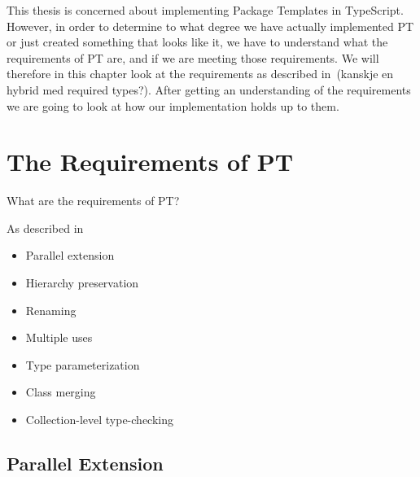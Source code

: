 
This thesis is concerned about implementing Package Templates in TypeScript.
However, in order to determine to what degree we have actually implemented PT or just created something that looks like it, we have to understand what the requirements of PT are, and if we are meeting those requirements.
We will therefore in this chapter look at the requirements as described in~\cite{jot}(kanskje en hybrid med required types?).
After getting an understanding of the requirements we are going to look at how our implementation holds up to them.

\section{The Requirements of PT}\label{sec:the-requirements-of-pt}

What are the requirements of PT?

As described in~\cite{jot}

\begin{multicols}{2}
    \begin{itemize}
        \item Parallel extension
        \item Hierarchy preservation
        \item Renaming
        \item Multiple uses
        \item Type parameterization
        \item Class merging
        \item Collection-level type-checking
    \end{itemize}
\end{multicols}

\subsection{Parallel Extension}\label{subsec:parallel-extension}
%

